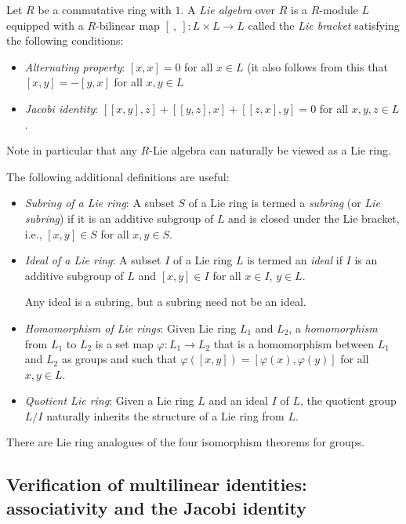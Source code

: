 \documentclass{ucetd}
\begin{document}
Let $R$ be a commutative ring with $1$. A {\em Lie algebra} over $R$
is a $R$-module $L$ equipped with a $R$-bilinear map $[ \ , \ ]:L
\times L \to L$ called the {\em Lie bracket} satisfying the following
conditions:

\begin{itemize}
\item {\em Alternating property}: $[x,x] = 0$ for all $x \in L$ (it
  also follows from this that $[x,y] = -[y,x]$ for all $x,y \in L$
\item {\em Jacobi identity}: $[[x,y],z] + [[y,z],x] + [[z,x],y] = 0$
  for all $x,y,z \in L$.
\end{itemize}

Note in particular that any $R$-Lie algebra can naturally be viewed as
a Lie ring.

The following additional definitions are useful:

\begin{itemize}
\item {\em Subring of a Lie ring}: A subset $S$ of a Lie ring is
  termed a {\em subring} (or {\em Lie subring}) if it is an additive
  subgroup of $L$ and is closed under the Lie bracket, i.e., $[x,y]
  \in S$ for all $x,y \in S$.
\item {\em Ideal of a Lie ring}: A subset $I$ of a Lie ring $L$ is
  termed an {\em ideal} if $I$ is an additive subgroup of $L$ and
  $[x,y] \in I$ for all $x \in I$, $y \in L$.

  Any ideal is a subring, but a subring need not be an ideal.
\item {\em Homomorphism of Lie rings}: Given Lie ring $L_1$ and $L_2$,
  a {\em homomorphism} from $L_1$ to $L_2$ is a set map $\varphi:L_1
  \to L_2$ that is a homomorphism between $L_1$ and $L_2$ as groups
  and such that $\varphi([x,y]) = [\varphi(x),\varphi(y)]$ for all $x,y \in L$.
\item {\em Quotient Lie ring}: Given a Lie ring $L$ and an ideal $I$
  of $L$, the quotient group $L/I$ naturally inherits the structure of
  a Lie ring from $L$.
\end{itemize}

There are Lie ring analogues of the four isomorphism theorems for groups.

\subsection{Verification of multilinear identities: associativity and the Jacobi identity}\label{appsec:multilinear}
\end{document}
